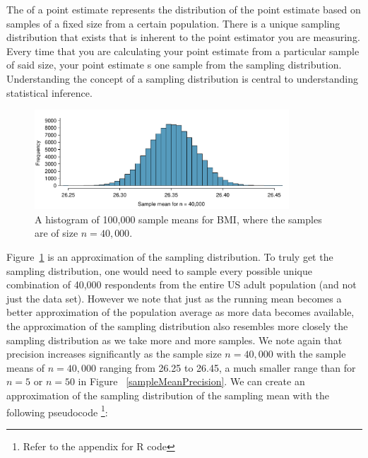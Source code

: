 \begin{termBox}{
The  of a point estimate represents the distribution of the point estimate based on samples of a fixed size from a certain population. There is a unique sampling distribution that exists that is inherent to the point estimator you are measuring. Every time that you are calculating your point estimate from a particular sample of said size, your point estimate s one sample from the sampling distribution. Understanding the concept of a sampling distribution is central to understanding statistical inference.}
\end{termBox}


\begin{figure}
   \centering
   \includegraphics[width=0.85\textwidth]{ch_inference_foundations_oi_biostat/figures/brfssBMISamplingDistribution/brfssBMISamplingDistribution}
   \caption{A histogram of 100,000 sample means for BMI, where the samples are of size $n=40,000$. }
      \label{brfssBMISamplingDistribution}
\end{figure}

Figure~\ref{brfssBMISamplingDistribution} is an approximation of the sampling distribution. To truly get the sampling distribution, one would need to sample every possible unique combination of 40,000 respondents from the entire US adult population (and not just the  data set). However we note that just as the running mean becomes a better approximation of the population average as more data becomes available, the approximation of the sampling distribution also resembles more closely the sampling distribution as we take more and more samples. We note again that precision increases significantly as the sample size $n=40,000$ with the sample means of $n=40,000$ ranging from 26.25 to 26.45, a much smaller range than for $n=5$ or $n=50$ in Figure ~\ref{sampleMeanPrecision}. We can create an approximation of the sampling distribution of the sampling mean with the following pseudocode \footnote{Refer to the appendix for R code}: 

